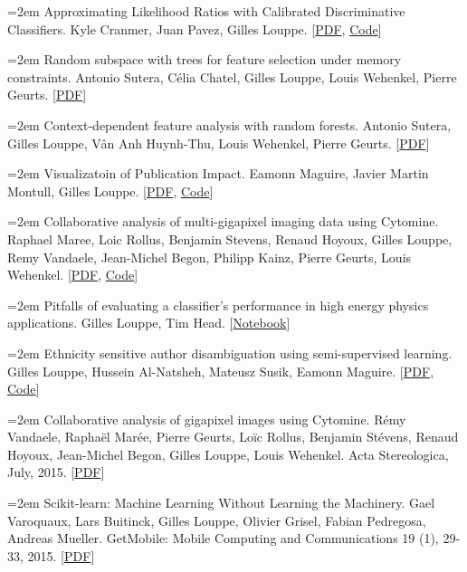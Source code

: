 \documentclass{scrartcl}
\newcommand{\MarginText}[1]{\marginpar{\raggedleft\itshape\small#1}}
\newcommand{\NewPublication}[4]{\noindent\hangindent=2em\hangafter=0 \MarginText{\color{black} #1}{\footnotesize [{\color{Maroon}#2}]} #3 {\footnotesize\color{gray}#4}\vspace{0.5em}}
\begin{document}
\begin{cv}{}
\NewPublication{}{20}{Approximating Likelihood Ratios with Calibrated Discriminative Classifiers.}{%
Kyle Cranmer, Juan Pavez, Gilles Louppe.
[\href{http://arxiv.org/abs/1506.02169}{PDF}, \href{https://github.com/diana-hep/carl}{Code}]}

\NewPublication{}{19}{Random subspace with trees for feature selection under memory constraints.}{%
Antonio Sutera, Célia Chatel, Gilles Louppe, Louis Wehenkel, Pierre Geurts.
[\href{http://hdl.handle.net/2268/202206}{PDF}]}

\NewPublication{}{18}{Context-dependent feature analysis with random forests.}{%
Antonio Sutera, Gilles Louppe, Vân Anh Huynh-Thu, Louis Wehenkel, Pierre Geurts.
[\href{https://arxiv.org/abs/1605.03848}{PDF}]}

\NewPublication{}{17}{Visualizatoin of Publication Impact.}{%
Eamonn Maguire, Javier Martin Montull, Gilles Louppe.
[\href{https://arxiv.org/abs/1605.06242}{PDF}, \href{https://github.com/inspirehep/impact-graphs}{Code}]}

\NewPublication{}{16}{Collaborative analysis of multi-gigapixel imaging data using Cytomine.}{%
Raphael Maree, Loic Rollus, Benjamin Stevens, Renaud Hoyoux, Gilles Louppe, Remy Vandaele, Jean-Michel Begon, Philipp Kainz, Pierre Geurts, Louis Wehenkel.
[\href{http://bioinformatics.oxfordjournals.org/content/early/2016/01/09/bioinformatics.btw013.full.pdf+html}{PDF}, \href{http://www.cytomine.be/}{Code}]}

\NewPublication{2015}{15}{Pitfalls of evaluating a classifier’s performance in high energy physics applications.}{%
Gilles Louppe, Tim Head.
[\href{http://dx.doi.org/10.5281/zenodo.34934}{Notebook}]}

\NewPublication{}{14}{Ethnicity sensitive author disambiguation using semi-supervised learning.}{%
Gilles Louppe, Hussein Al-Natsheh, Mateusz Susik, Eamonn Maguire.
[\href{http://arxiv.org/abs/1508.07744}{PDF}, \href{https://github.com/glouppe/paper-author-disambiguation/}{Code}]}

\NewPublication{}{13}{Collaborative analysis of gigapixel images using Cytomine.}{%
Rémy Vandaele, Raphaël Marée, Pierre Geurts, Loïc Rollus, Benjamin Stévens, Renaud Hoyoux, Jean-Michel Begon, Gilles Louppe, Louis Wehenkel.
Acta Stereologica, July, 2015.
[\href{http://popups.ulg.ac.be/0351-580X/index.php?id=3692&file=1&pid=3681}{PDF}]}

\NewPublication{}{12}{Scikit-learn: Machine Learning Without Learning the Machinery.}{%
Gael Varoquaux, Lars Buitinck, Gilles Louppe, Olivier Grisel, Fabian Pedregosa, Andreas Mueller.
GetMobile: Mobile Computing and Communications 19 (1), 29-33, 2015.
[\href{https://dl.acm.org/citation.cfm?id=2786995}{PDF}]}


\end{cv}
\end{document}
